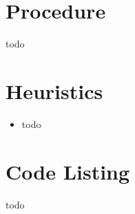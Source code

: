 \documentclass[a4paper, 11pt]{article}
\begin{document}
\section{Procedure}
\label{sec:procedure}
todo

\section{Heuristics}
\label{sec:heuristics}
\begin{itemize}
	\item todo
\end{itemize}

\section{Code Listing}
\label{sec:code}
todo


\end{document}
